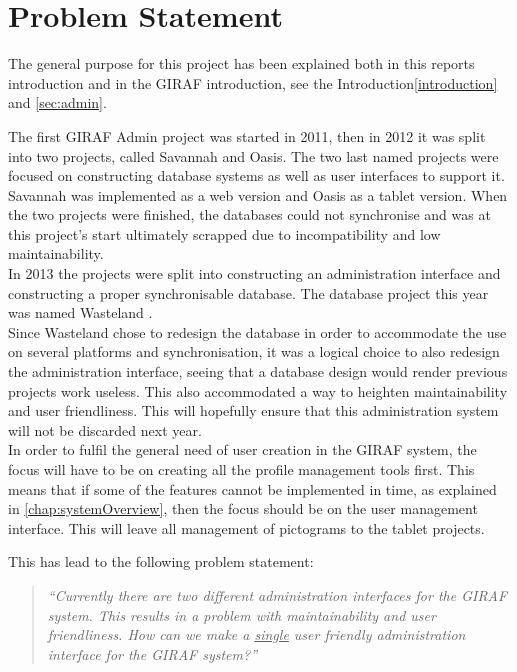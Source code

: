 \chapter{Problem Statement}
\label{chap:problemStatment}
The general purpose for this project has been explained both in this reports introduction and in the GIRAF introduction, see the Introduction\vref{introduction} and \ref{sec:admin}.

The first GIRAF Admin project was started in 2011, then in 2012 it was split into two projects, called Savannah and Oasis. The two last named projects were focused on constructing database systems as well as user interfaces to support it. Savannah was implemented as a web version and Oasis as a tablet version. When the two projects were finished, the databases could not synchronise and was at this project's start ultimately scrapped due to incompatibility and low maintainability.\\
In 2013 the projects were split into constructing an administration interface and constructing a proper synchronisable database. The database project this year was named Wasteland \citep{wasteland}.\\

Since Wasteland chose to redesign the database in order to accommodate the use on several platforms and synchronisation, it was a logical choice to also redesign the administration interface, seeing that a database design would render previous projects work useless. This also accommodated a way to heighten maintainability and user friendliness. This will hopefully ensure that this administration system will not be discarded next year.\\
In order to fulfil the general need of user creation in the GIRAF system, the focus will have to be on creating all the profile management tools first. This means that if some of the features cannot be implemented in time, as explained in \vref{chap:systemOverview}, then the focus should be on the user management interface. This will leave all management of pictograms to the tablet projects.

This has lead to the following problem statement:
\begin{verse}
\textit{``Currently there are two different administration interfaces for the GIRAF system.
This results in a problem with maintainability and user friendliness.
How can we make a \underline{single} user friendly administration interface for the GIRAF system?''}
\end{verse}
